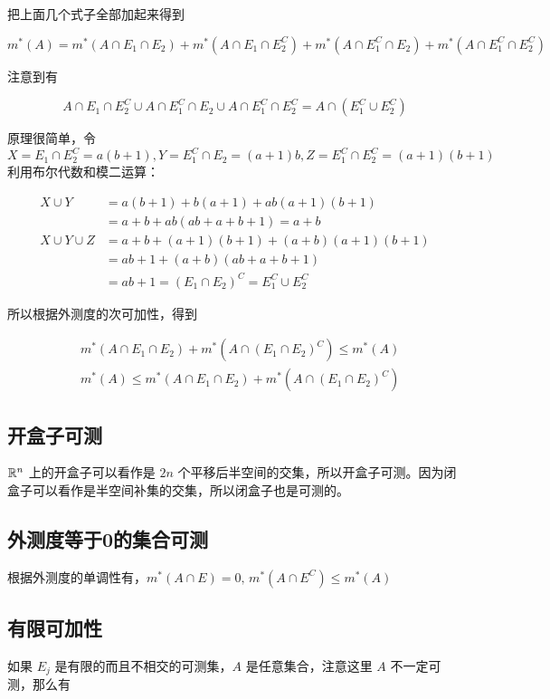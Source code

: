 把上面几个式子全部加起来得到

\[
m^*(A) = m^*(A \cap E_1 \cap E_2) + m^*(A \cap E_1 \cap E_2^{C}) + m^*(A \cap E_1^{C} \cap E_2) + m^*(A \cap E_1^{C} \cap E_2^C)
\]

注意到有 

\[
A \cap E_1 \cap E_2^{C} \cup A \cap E_1^{C} \cap E_2 \cup A \cap E_1^{C} \cap E_2^C = A \cap (E_1^C \cup E_2^C)
\]

原理很简单，令$X = E_1 \cap E_2^{C} = a(b+1), Y = E_1^{C} \cap E_2 = (a+1)b, Z = E_1^C \cap E_2^C = (a+1)(b+1)$ 利用布尔代数和模二运算：

\begin{align*}
    X \cup Y &= a(b+1) + b(a+1) + ab(a+1)(b+1) \\
        & = a + b + ab(ab + a+b + 1) = a+b \\
    X \cup Y \cup Z & = a + b + (a+1)(b+1) + (a+b)(a+1)(b+1) \\
    & = ab + 1 + (a+b)(ab + a+b + 1) \\
    &= ab + 1 = (E_1 \cap E_2)^C = E_1^C \cup E_2^C
\end{align*}

所以根据外测度的次可加性，得到

\begin{align*}
 & m^*(A \cap E_1 \cap E_2) + m^*(A \cap (E_1 \cap E_2)^C) \le m^*(A) \\
 & m^*(A) \le  m^*(A \cap E_1 \cap E_2) + m^*(A \cap (E_1 \cap E_2)^C)
\end{align*}

\subsection{开盒子可测}

$\mathbb{R}^n$ 上的开盒子可以看作是 $2n$ 个平移后半空间的交集，所以开盒子可测。因为闭盒子可以看作是半空间补集的交集，所以闭盒子也是可测的。

\subsection{外测度等于0的集合可测}

根据外测度的单调性有，$m^*(A \cap E) = 0,\, m^*(A \cap E^C) \le m^*(A)$

\subsection{有限可加性}

如果 $E_j$ 是有限的而且不相交的可测集，$A$ 是任意集合，注意这里 $A$ 不一定可测，那么有

